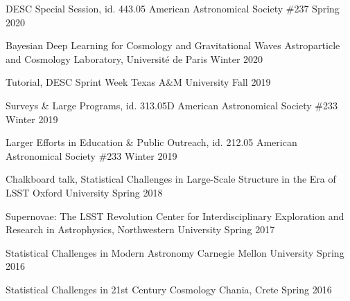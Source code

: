 \documentclass[12pt,letterpaper]{article}
\begin{document}
{}
\begin{list}{}{\malzlist}
\item {}
	{DESC Special Session, id. 443.05}
	{American Astronomical Society \#237}
	{Spring 2020}
\item {}
	{Bayesian Deep Learning for Cosmology and Gravitational Waves}
	{Astroparticle and Cosmology Laboratory, Université de Paris}
	{Winter 2020}
\item {}
	{Tutorial, DESC Sprint Week}
	{Texas A\&M University}
	{Fall 2019}
\item {}
	{Surveys \& Large Programs, id. 313.05D}
	{American Astronomical Society \#233}
	{Winter 2019}
\item {}
	{Larger Efforts in Education \& Public Outreach, id. 212.05}
	{American Astronomical Society \#233}
	{Winter 2019}
\item {}
	{Chalkboard talk, Statistical Challenges in Large-Scale Structure in the Era of LSST}
	{Oxford University}
	{Spring 2018}
\item {}
	{Supernovae: The LSST Revolution}
	{Center for Interdisciplinary Exploration and Research in Astrophysics, Northwestern University}
	{Spring 2017}
\item {}
	{Statistical Challenges in Modern Astronomy}
	{Carnegie Mellon University}
	{Spring 2016}
\item {}
	{Statistical Challenges in 21st Century Cosmology}
	{Chania, Crete}
	{Spring 2016}
\end{list}
\end{document}
